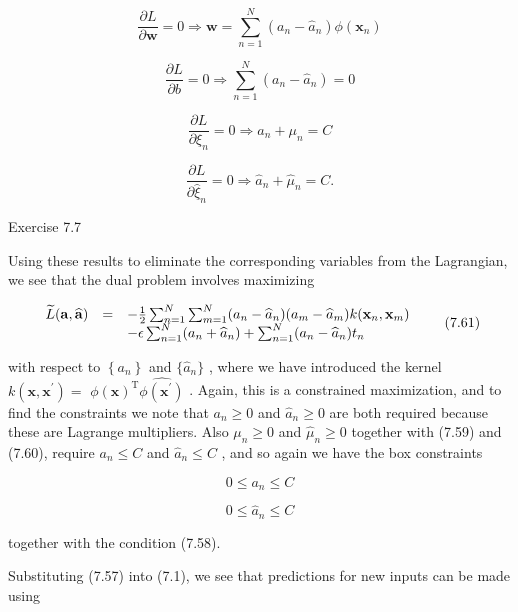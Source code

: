 \documentclass[
  10
]{article}
\begin{document}
\[
\frac {\partial L}{\partial \mathbf {w}} = 0 \Rightarrow \mathbf {w} = \sum_ {n = 1} ^ {N} (a _ {n} - \widehat {a} _ {n}) \phi (\mathbf {x} _ {n})\tag{7.57}
\]

\[
\frac {\partial L}{\partial b} = 0 \Rightarrow \sum_ {n = 1} ^ {N} (a _ {n} - \widehat {a} _ {n}) = 0\tag{7.58}
\]

\[
\frac {\partial L}{\partial \xi_ {n}} = 0 \Rightarrow a _ {n} + \mu_ {n} = C\tag{7.59}
\]

\[
\frac {\partial L}{\partial \widehat {\xi} _ {n}} = 0 \Rightarrow \widehat {a} _ {n} + \widehat {\mu} _ {n} = C.\tag{7.60}
\]

Exercise 7.7

Using these results to eliminate the corresponding variables from the
Lagrangian, we see that the dual problem involves maximizing

\[
\begin{array}{r c l} \widetilde {L} (\mathbf {a}, \widehat {\mathbf {a}}) & = & - \frac {1}{2} \sum_ {n = 1} ^ {N} \sum_ {m = 1} ^ {N} (a _ {n} - \widehat {a} _ {n}) (a _ {m} - \widehat {a} _ {m}) k (\mathbf {x} _ {n}, \mathbf {x} _ {m}) \\ & & - \epsilon \sum_ {n = 1} ^ {N} (a _ {n} + \widehat {a} _ {n}) + \sum_ {n = 1} ^ {N} (a _ {n} - \widehat {a} _ {n}) t _ {n} \end{array}\tag{7.61}
\]

with respect to \(\left\{ a _ { n } \right\}\) and
\(\{ \widehat { a } _ { n } \}\) , where we have introduced the kernel
\(k ( \mathbf { x } , \mathbf { x } ^ { \prime } ) =\)
\(\phi ( \mathbf { x } ) ^ { \mathrm { T } } \hat { \phi ( \mathbf { x } ^ { \prime } ) }\)
. Again, this is a constrained maximization, and to find the constraints
we note that \(a _ { n } \geqslant 0\) and
\(\widehat { a } _ { n } \geqslant 0\) are both required because these
are Lagrange multipliers. Also \(\mu _ { n } \geqslant 0\) and
\(\widehat { \mu } _ { n } \geqslant 0\) together with (7.59) and
(7.60), require \(a _ { n } \leqslant C\) and
\(\widehat { a } _ { n } \leqslant C\) , and so again we have the box
constraints

\[
0 \leqslant a _ {n} \leqslant C\tag{7.62}
\]

\[
0 \leqslant \widehat {a} _ {n} \leqslant C\tag{7.63}
\]

together with the condition (7.58).

Substituting (7.57) into (7.1), we see that predictions for new inputs
can be made using
\end{document}
